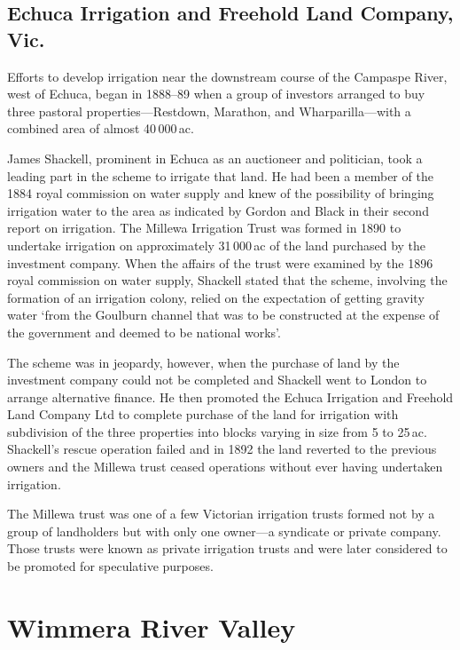 \subsection*{Echuca Irrigation and Freehold Land Company, Vic.}

Efforts to develop irrigation near the downstream course of the
Campaspe River, west of Echuca, began in 1888--89 when a group of
investors arranged to buy three pastoral properties---Restdown,
Marathon, and Wharparilla---with a combined area of almost
40\,000\,ac.

James Shackell, prominent in Echuca as an auctioneer and politician,
took a leading part in the scheme to irrigate that land.  He had been
a member of the 1884 royal commission on water supply and knew of the
possibility of bringing irrigation water to the area as indicated by
Gordon and Black in their second report on irrigation.  The Millewa Irrigation
Trust was formed in 1890 to undertake irrigation on approximately
31\,000\,ac of the land purchased by the investment company.  When the
affairs of the trust were examined by the 1896 royal commission on
water supply, Shackell stated that the scheme, involving the formation
of an irrigation colony, relied on the expectation of getting gravity
water `from the Goulburn channel that was to be constructed at the
expense of the government and deemed to be national works'.

The scheme was in jeopardy, however, when the purchase of land by the
investment company could not be completed and Shackell went to London
to arrange alternative finance.  He then promoted the Echuca
Irrigation and Freehold Land Company Ltd to complete purchase of the
land for irrigation with subdivision of the three properties into
blocks varying in size from 5 to 25\,ac.  Shackell's
 rescue operation failed and in 1892 the land reverted to the previous
owners and the Millewa trust ceased operations without ever having
undertaken irrigation.

The Millewa trust was one of a few Victorian irrigation trusts formed
not by a group of landholders but with only one owner---a syndicate
or private company.  Those trusts were known as private irrigation
trusts and were later considered to be promoted for speculative
purposes.

\section*{Wimmera River Valley}

